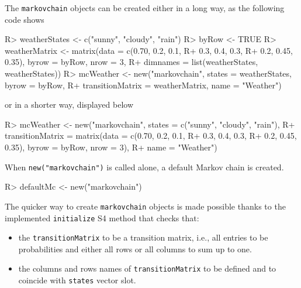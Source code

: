 \documentclass[article,nojss]{jss}
\providecommand{\tightlist}{%
  \setlength{\itemsep}{0pt}\setlength{\parskip}{0pt}}
\begin{document}
The \texttt{markovchain} objects can be created either in a long way, as the following code shows

\begin{CodeChunk}

\begin{CodeInput}
R> weatherStates <- c("sunny", "cloudy", "rain")
R> byRow <- TRUE
R> weatherMatrix <- matrix(data = c(0.70, 0.2, 0.1,
R+                        0.3, 0.4, 0.3,
R+                        0.2, 0.45, 0.35), byrow = byRow, nrow = 3,
R+                      dimnames = list(weatherStates, weatherStates))
R> mcWeather <- new("markovchain", states = weatherStates, byrow = byRow, 
R+                transitionMatrix = weatherMatrix, name = "Weather")
\end{CodeInput}
\end{CodeChunk}

or in a shorter way, displayed below

\begin{CodeChunk}

\begin{CodeInput}
R> mcWeather <- new("markovchain", states = c("sunny", "cloudy", "rain"),
R+                  transitionMatrix = matrix(data = c(0.70, 0.2, 0.1,
R+                        0.3, 0.4, 0.3,
R+                        0.2, 0.45, 0.35), byrow = byRow, nrow = 3), 
R+                  name = "Weather")
\end{CodeInput}
\end{CodeChunk}

When \texttt{new("markovchain")} is called alone, a default Markov chain is created.

\begin{CodeChunk}

\begin{CodeInput}
R> defaultMc <- new("markovchain")
\end{CodeInput}
\end{CodeChunk}

The quicker way to create \texttt{markovchain} objects is made possible thanks to the implemented \texttt{initialize} S4 method that checks that:

\begin{itemize}
\tightlist
\item
  the \texttt{transitionMatrix} to be a transition matrix, i.e., all entries to be probabilities and either all rows or all columns to sum up to one.
\item
  the columns and rows names of \texttt{transitionMatrix} to be defined and to coincide with \texttt{states} vector slot.
\end{itemize}
\end{document}
